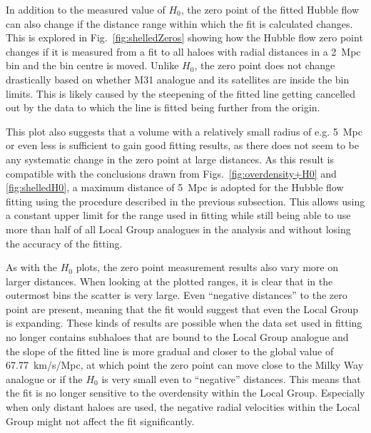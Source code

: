 \documentclass[english, oneside]{HYgradu}
\begin{document}


In addition to the measured value of $H_0$, the zero point of the fitted Hubble flow can also change if the distance range within which the fit is calculated changes. This is explored in Fig.~\ref{fig:shelledZeros} showing how the Hubble flow zero point changes if it is measured from a fit to all haloes with radial distances in a 2~Mpc bin and the bin centre is moved. Unlike $H_0$, the zero point does not change drastically based on whether M31 analogue and its satellites are inside the bin limits. This is likely caused by the steepening of the fitted line getting cancelled out by the data to which the line is fitted being further from the origin. 

This plot also suggests that a volume with a relatively small radius of e.g. 5~Mpc or even less is sufficient to gain good fitting results, as there does not seem to be any systematic change in the zero point at large distances. As this result is compatible with the conclusions drawn from Figs.~\ref{fig:overdensity+H0} and \ref{fig:shelledH0}, a maximum distance of 5~Mpc is adopted for the Hubble flow fitting using the procedure described in the previous subsection. This allows using a constant upper limit for the range used in fitting while still being able to use more than half of all Local Group analogues in the analysis and without losing the accuracy of the fitting.

As with the $H_0$ plots, the zero point measurement results also vary more on larger distances. When looking at the plotted ranges, it is clear that in the outermost bins the scatter is very large. Even ``negative distances'' to the zero point are present, meaning that the fit would suggest that even the Local Group is expanding. These kinds of results are possible when the data set used in fitting no longer contains subhaloes that are bound to the Local Group analogue and the slope of the fitted line is more gradual and closer to the global value of 67.77~km/s/Mpc, at which point the zero point can move close to the Milky Way analogue or if the $H_0$ is very small even to ``negative'' distances. This means that the fit is no longer sensitive to the overdensity within the Local Group. Especially when only distant haloes are used, the negative radial velocities within the Local Group might not affect the fit significantly.
\end{document}
